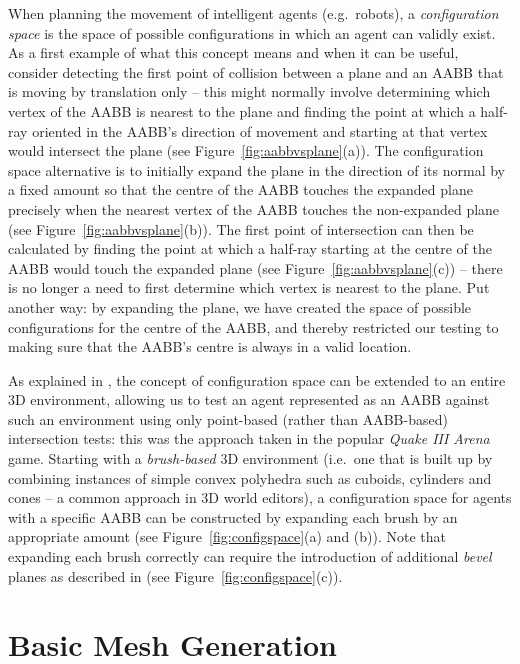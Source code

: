 \documentclass[10pt,twocolumn]{article}
\begin{document}
When planning the movement of intelligent agents (e.g.~robots), a \emph{configuration space} is the space of possible configurations in which an agent can validly exist. As a first example of what this concept means and when it can be useful, consider detecting the first point of collision between a plane and an AABB that is moving by translation only -- this might normally involve determining which vertex of the AABB is nearest to the plane and finding the point at which a half-ray oriented in the AABB's direction of movement and starting at that vertex would intersect the plane (see Figure~\ref{fig:aabbvsplane}(a)). The configuration space alternative is to initially expand the plane in the direction of its normal by a fixed amount so that the centre of the AABB touches the expanded plane precisely when the nearest vertex of the AABB touches the non-expanded plane (see Figure~\ref{fig:aabbvsplane}(b)). The first point of intersection can then be calculated by finding the point at which a half-ray starting at the centre of the AABB would touch the expanded plane (see Figure~\ref{fig:aabbvsplane}(c)) -- there is no longer a need to first determine which vertex is nearest to the plane. Put another way: by expanding the plane, we have created the space of possible configurations for the centre of the AABB, and thereby restricted our testing to making sure that the AABB's centre is always in a valid location.

As explained in \cite{vanwaveren01}, the concept of configuration space can be extended to an entire 3D environment, allowing us to test an agent represented as an AABB against such an environment using only point-based (rather than AABB-based) intersection tests: this was the approach taken in the popular \emph{Quake III Arena} game. Starting with a \emph{brush-based} 3D environment (i.e.~one that is built up by combining instances of simple convex polyhedra such as cuboids, cylinders and cones -- a common approach in 3D world editors), a configuration space for agents with a specific AABB can be constructed by expanding each brush by an appropriate amount (see Figure~\ref{fig:configspace}(a) and (b)). Note that expanding each brush correctly can require the introduction of additional \emph{bevel} planes as described in \cite{vanwaveren01} (see Figure~\ref{fig:configspace}(c)).

\section{Basic Mesh Generation}
\label{sec:meshgen}
\end{document}
